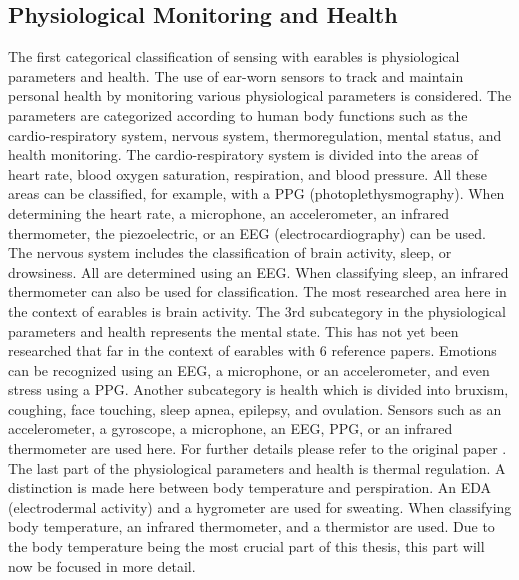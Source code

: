 \subsection{Physiological Monitoring and Health}
\label{Background:SensingWithEarables:Physiological}
The first categorical classification of sensing with earables is physiological parameters and health.
The use of ear-worn sensors to track and maintain personal health by monitoring various physiological parameters is considered.
The parameters are categorized according to human body functions such as the cardio-respiratory system, nervous system, thermoregulation, mental status, and health monitoring.
The cardio-respiratory system is divided into the areas of heart rate, blood oxygen saturation, respiration, and blood pressure.
All these areas can be classified, for example, with a PPG (photoplethysmography). 
When determining the heart rate, a microphone, an accelerometer, an infrared thermometer, the piezoelectric, or an EEG (electrocardiography) can be used.
The nervous system includes the classification of brain activity, sleep, or drowsiness. 
All are determined using an EEG. When classifying sleep, an infrared thermometer can also be used for classification. 
The most researched area here in the context of earables is brain activity.
The 3rd subcategory in the physiological parameters and health represents the mental state.
This has not yet been researched that far in the context of earables with 6 reference papers.
Emotions can be recognized using an EEG, a microphone, or an accelerometer, and even stress using a PPG.
Another subcategory is health which is divided into bruxism, coughing, face touching, sleep apnea, epilepsy, and ovulation.
Sensors such as an accelerometer, a gyroscope, a microphone, an EEG, PPG, or an infrared thermometer are used here.
For further details please refer to the original paper \cite{roddigerSensingEarablesSystematic2022a}.
The last part of the physiological parameters and health is thermal regulation. A distinction is made here between body temperature and perspiration. An EDA (electrodermal activity) and a hygrometer are used for sweating.
When classifying body temperature, an infrared thermometer, and a thermistor are used.
Due to the body temperature being the most crucial part of this thesis, this part will now be focused in more detail.

